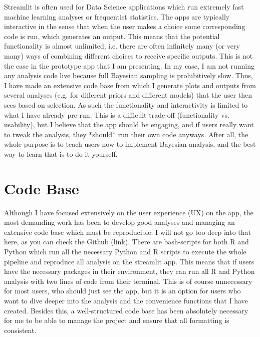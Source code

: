 \documentclass[12pt]{article}
\begin{document}
Streamlit is often used for Data Science applications which run extremely
fast machine learning analyses or frequentist statistics. The apps are typically
interactive in the sense that when the user makes a choice some corresponding code is run,
which generates an output. This means that the potential functionality is almost
unlimited, i.e. there are often infinitely many (or very many) ways of combining different
choices to receive specific outputs. This is not the case in the prototype app that
I am presenting. In my case, I am not running any analysis code live because full
Bayesian sampling is prohibitively slow. Thus, I have made an extensive code base
from which I generate plots and outputs from several analyses
(e.g. for different priors and different models) that the user then sees based on
selection. As such the functionality and interactivity is limited to what I have
already pre-run. This is a difficult trade-off (functionality vs. usability),
but I believe that the app should be engaging, and if users really want to tweak
the analysis, they *should* run their own code anyways. After all, the whole
purpose is to teach users how to implement Bayesian analysis,
and the best way to learn that is to do it yourself.

\section{Code Base}
Although I have focused extensively on the user experience (UX) on the app,
the most demanding work has been to develop good analyses and managing an extensive
code base which must be reproducible. I will not go too deep into that here,
as you can check the Github (link). There are bash-scripts for both R and Python
which run all the necessary Python and R scripts to execute the whole pipeline
and reproduce all analysis on the streamlit app. This means that if users have
the necessary packages in their environment, they can run all R and Python analysis
with two lines of code from their terminal. This is of course unnecessary for most users,
who should just see the app, but it is an option for users who want to dive deeper
into the analysis and the convenience functions that I have created.
Besides this, a well-structured code base has been absolutely necessary for me to
be able to manage the project and ensure that all formatting is consistent.
\end{document}

